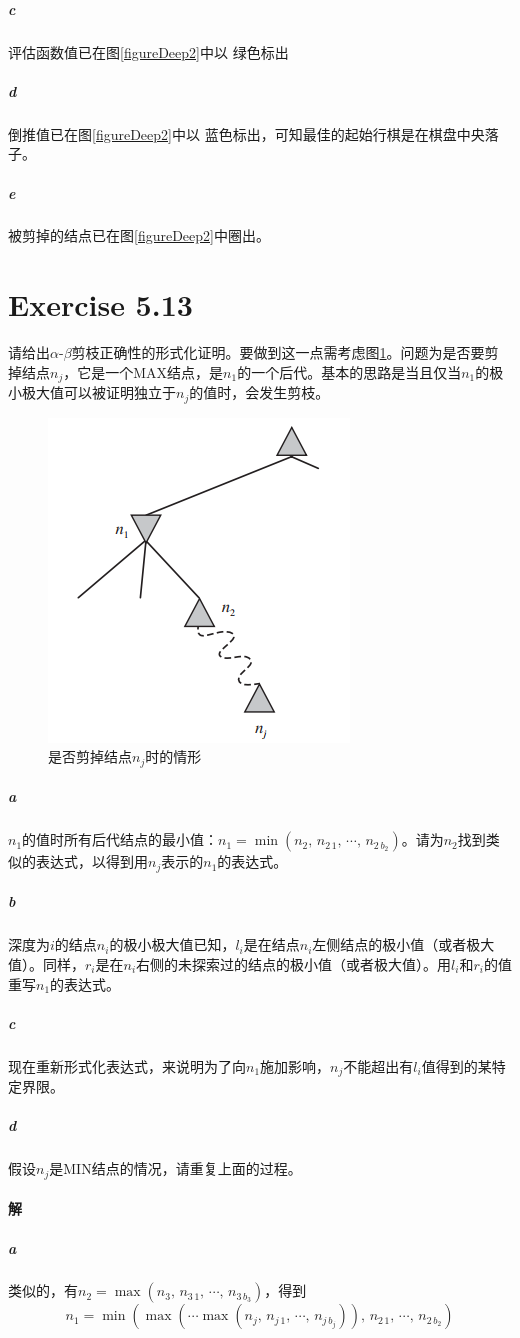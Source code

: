\documentclass{article}
\newcounter{col}
\begin{document}
\subparagraph{c}
评估函数值已在图\ref{figureDeep2}中以{\color{green!70!black} 绿色}标出

\subparagraph{d}
倒推值已在图\ref{figureDeep2}中以{\color{blue} 蓝色}标出，可知最佳的起始行棋是在棋盘中央落子。

\subparagraph{e}
被剪掉的结点已在图\ref{figureDeep2}中圈出。

\section{Exercise 5.13}
请给出$\alpha$-$\beta$剪枝正确性的形式化证明。要做到这一点需考虑图\ref{figure5.18}。问题为是否要剪掉结点$n_j$，它是一个MAX结点，是$n_1$的一个后代。基本的思路是当且仅当$n_1$的极小极大值可以被证明独立于$n_j$的值时，会发生剪枝。
\begin{figure}[h]
    {
        \centering
        \includegraphics[]{Figure5-18.png}
        \caption{是否剪掉结点$n_j$时的情形}
        \label{figure5.18}
    }
\end{figure}
\subparagraph{a}
$n_1$的值时所有后代结点的最小值：$n_1 = \min(n_2,\, n_{2\,1},\, \cdots,\, n_{2\,b_2})$。请为$n_2$找到类似的表达式，以得到用$n_j$表示的$n_1$的表达式。
\subparagraph{b}
深度为$i$的结点$n_i$的极小极大值已知，$l_i$是在结点$n_i$左侧结点的极小值（或者极大值）。同样，$r_i$是在$n_i$右侧的未探索过的结点的极小值（或者极大值）。用$l_i$和$r_i$的值重写$n_1$的表达式。
\subparagraph{c}
现在重新形式化表达式，来说明为了向$n_1$施加影响，$n_j$不能超出有$l_i$值得到的某特定界限。
\subparagraph{d}
假设$n_j$是MIN结点的情况，请重复上面的过程。

\paragraph{解}
\subparagraph{a}
类似的，有$n_2 = \max(n_3,\, n_{3\,1},\, \cdots,\, n_{3\,b_3})$，得到
\begin{equation*}
    n_1 = \min(\max( \cdots \max(n_j,\, n_{j\,1},\, \cdots,\, n_{j\,b_j})),\, n_{2\,1},\, \cdots,\, n_{2\,b_2})
\end{equation*}
\end{document}
